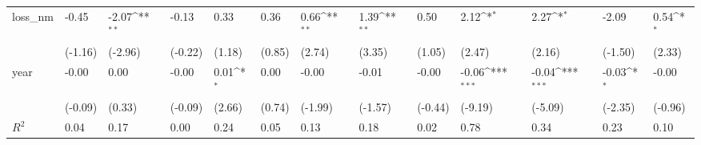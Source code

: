 \def\sym#1{\ifmmode^{#1}\else\(^{#1}\)\fi}
\begin{tabular}{p{1.5cm} p{1.7cm} p{1.7cm} p{1.7cm}  p{1.7cm} p{1.7cm} p{1.7cm} p{1.7cm} p{1.7cm}  p{1.7cm} p{1.7cm} p{1.7cm} p{1.7cm} }
\hline
loss\_nm         &    -0.45         &    -2.07\sym{**} &    -0.13         &     0.33         &     0.36         &     0.66\sym{**} &     1.39\sym{**} &     0.50         &     2.12\sym{*}  &     2.27\sym{*}  &    -2.09         &     0.54\sym{*}  \\
                &  (-1.16)         &  (-2.96)         &  (-0.22)         &   (1.18)         &   (0.85)         &   (2.74)         &   (3.35)         &   (1.05)         &   (2.47)         &   (2.16)         &  (-1.50)         &   (2.33)         \\
year            &    -0.00         &     0.00         &    -0.00         &     0.01\sym{*}  &     0.00         &    -0.00         &    -0.01         &    -0.00         &    -0.06\sym{***}&    -0.04\sym{***}&    -0.03\sym{*}  &    -0.00         \\
                &  (-0.09)         &   (0.33)         &  (-0.09)         &   (2.66)         &   (0.74)         &  (-1.99)         &  (-1.57)         &  (-0.44)         &  (-9.19)         &  (-5.09)         &  (-2.35)         &  (-0.96)         \\
\hline
\(R^{2}\)       &     0.04         &     0.17         &     0.00         &     0.24         &     0.05         &     0.13         &     0.18         &     0.02         &     0.78         &     0.34         &     0.23         &     0.10         \\
\end{tabular}
\def\sym#1{\ifmmode^{#1}\else\(^{#1}\)\fi}
